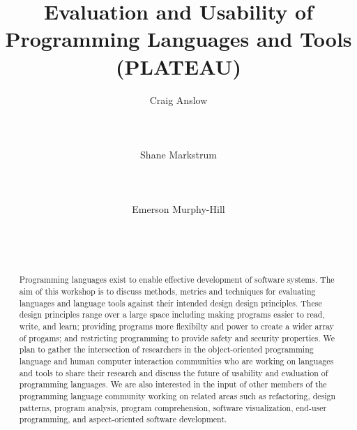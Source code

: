 \documentclass{acm_proc_article-sp}
\begin{document}
\title{Evaluation and Usability of Programming Languages and Tools (PLATEAU)}

\author{
\alignauthor Craig Anslow\\
       \\
       \\
       \\
\alignauthor Shane Markstrum\\
       \\
       \\
       \\
\alignauthor Emerson Murphy-Hill\\
       \\
       \\
       \\
       }

\date{}

\maketitle
\begin{abstract}

Programming languages exist to enable effective development of
software systems. The aim of this workshop is to discuss methods,
metrics and techniques for evaluating languages and language tools
against their intended design design principles. These design
principles range over a large space including making programs easier
to read, write, and learn; providing programs more flexibilty and
power to create a wider array of progams; and restricting programming
to provide safety and security properties. We plan to gather the
intersection of researchers in the object-oriented programming
language and human computer interaction communities who are working on
languages and tools to share their research and discuss the future of
usability and evaluation of programming languages. We are also
interested in the input of other members of the programming language
community working on related areas such as refactoring, design
patterns, program analysis, program comprehension, software
visualization, end-user programming, and aspect-oriented software
development.

\end{abstract}
\end{document}
